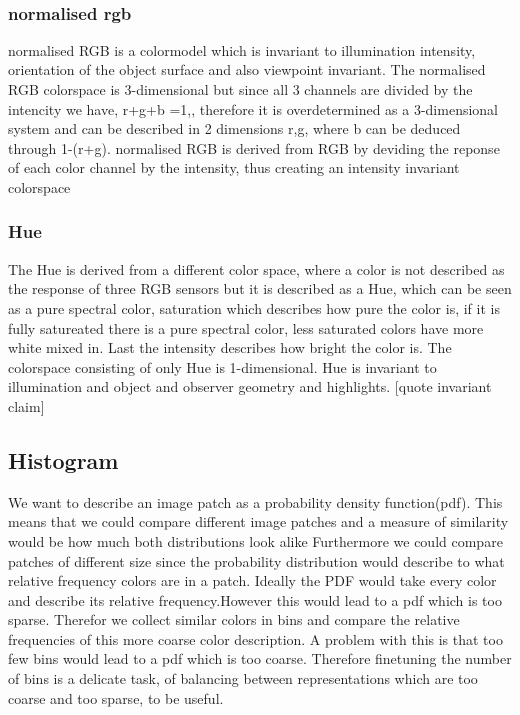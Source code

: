 \documentclass[a4paper,11pt]{article}
\begin{document}
		\

		\subsubsection{normalised rgb}
		normalised RGB is a colormodel which is invariant to illumination intensity, orientation of the object surface and also viewpoint invariant. 
		The normalised RGB colorspace is 3-dimensional but since all 3 channels are divided by the intencity we have, r+g+b =1,, therefore it is overdetermined as a 3-dimensional system and can be described in 2 dimensions r,g, where b can be deduced through 1-(r+g).
		normalised RGB is derived from RGB by deviding the reponse of each color channel by the intensity, thus creating an intensity invariant colorspace
		\subsubsection{Hue}
		The Hue is derived from a different color space, where a color is not described as the response of three RGB sensors but it is described as a Hue, which can be seen as a pure spectral color, saturation which describes how pure the color is, if it is fully satureated there is a pure spectral color, less saturated colors have more white mixed in. Last the intensity describes how bright the color is. 
		The colorspace consisting of only Hue is 1-dimensional.
		Hue is invariant to illumination and object and observer geometry and highlights. [quote invariant claim]
	\subsection{Histogram}
		We want to describe an image patch as a probability density function(pdf). This means that we could compare different image patches and a measure of similarity would be how much both distributions look alike %
		Furthermore we could compare patches of different size since the probability distribution would describe to what relative frequency colors are in a patch.
		Ideally the PDF  would take every color and describe its relative frequency.However this would lead to a pdf which is too sparse. Therefor we collect similar colors in bins and compare the relative frequencies of this more coarse color description. A problem with this is that too few bins would lead to a pdf which is too coarse. Therefore finetuning the number of bins is a delicate task, of balancing between representations which are too coarse and too sparse, to be useful. 
\end{document}
